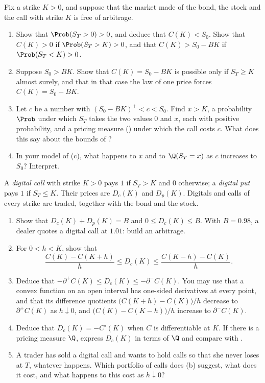 \begin{exercise}\label{ex:arb-range}
\easy Fix a strike $K>0$, and suppose that the market made of the bond, the stock and the
call with strike $K$ is free of arbitrage.
\begin{enumerate}[label=(\alph*)]
  \item Show that $\Prob(S_T>0)>0$, and deduce that $C(K)<S_0$. Show that $C(K)>0$ if
    $\Prob(S_T>K)>0$, and that $C(K)>S_0-BK$ if $\Prob(S_T<K)>0$.
  \item Suppose $S_0>BK$. Show that $C(K)=S_0-BK$ is possible only if $S_T\ge K$ almost
    surely, and that in that case the law of one price forces $C(K)=S_0-BK$.
  \item Let $c$ be a number with $(S_0-BK)^+<c<S_0$. Find $x>K$, a probability $\Prob$ under
    which $S_T$ takes the two values $0$ and $x$, each with positive probability, and a pricing
    measure () under which the call costs $c$. What does this say
    about the bounds of ?
  \item In your model of (c), what happens to $x$ and to $\Q(S_T=x)$ as $c$ increases to
    $S_0$? Interpret.
\end{enumerate}
\end{exercise}

\begin{exercise}\label{ex:arb-digital}
\medium A \emph{digital call} with strike $K>0$ pays $1$ if $S_T>K$ and $0$ otherwise; a
\emph{digital put} pays $1$ if $S_T\le K$. Their prices are $D_c(K)$ and $D_p(K)$. Digitals
and calls of every strike are traded, together with the bond and the stock.
\begin{enumerate}[label=(\alph*)]
  \item Show that $D_c(K)+D_p(K)=B$ and $0\le D_c(K)\le B$. With $B=0.98$, a dealer quotes a
    digital call at $1.01$: build an arbitrage.
  \item For $0<h<K$, show that
    \[
      \frac{C(K)-C(K+h)}{h}\le D_c(K)\le\frac{C(K-h)-C(K)}{h}.
    \]
  \item Deduce that $-\partial^+C(K)\le D_c(K)\le-\partial^-C(K)$. You may use that a convex
    function on an open interval has one-sided derivatives at every point, and that its
    difference quotients $\big(C(K+h)-C(K)\big)/h$ decrease to $\partial^+C(K)$ as
    $h\downarrow0$, and $\big(C(K)-C(K-h)\big)/h$ increase to $\partial^-C(K)$.
  \item Deduce that $D_c(K)=-C'(K)$ when $C$ is differentiable at $K$. If there is a pricing
    measure $\Q$, express $D_c(K)$ in terms of $\Q$ and compare with
    .
  \item A trader has sold a digital call and wants to hold calls so that she never loses at
    $T$, whatever happens. Which portfolio of calls does (b) suggest, what does it cost, and
    what happens to this cost as $h\downarrow0$?
\end{enumerate}
\end{exercise}

